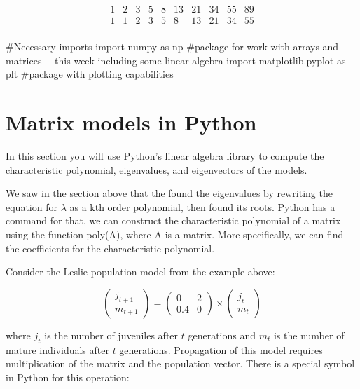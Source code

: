 \documentclass[
  letterpaper,
  DIV=11,
  numbers=noendperiod]{scrreprt}
\newenvironment{Shaded}{\begin{snugshade}}{\end{snugshade}}
\newcommand{\CommentTok}[1]{\textcolor[rgb]{0.37,0.37,0.37}{#1}}
\newcommand{\ImportTok}[1]{\textcolor[rgb]{0.00,0.46,0.62}{#1}}
\newcommand{\NormalTok}[1]{\textcolor[rgb]{0.00,0.23,0.31}{#1}}
\begin{document}
\[
\begin{array}{cccccccccc} 
 1 & 2 & 3 & 5 & 8 & 13 & 21 & 34 & 55 & 89 \\
 1 & 1 & 2 & 3 & 5 & 8 & 13  &  21 & 34 & 55  \\
 \end{array}
\]

\begin{Shaded}
\begin{Highlighting}[]
\CommentTok{\#Necessary imports}
\ImportTok{import}\NormalTok{ numpy }\ImportTok{as}\NormalTok{ np }\CommentTok{\#package for work with arrays and matrices {-}{-} this week including some linear algebra}
\ImportTok{import}\NormalTok{ matplotlib.pyplot }\ImportTok{as}\NormalTok{ plt }\CommentTok{\#package with plotting capabilities}
\end{Highlighting}
\end{Shaded}

\hypertarget{matrix-models-in-python}{%
\section{Matrix models in Python}\label{matrix-models-in-python}}

In this section you will use Python's linear algebra library to compute
the characteristic polynomial, eigenvalues, and eigenvectors of the
models.

We saw in the section above that the found the eigenvalues by rewriting
the equation for \(\lambda\) as a kth order polynomial, then found its
roots. Python has a command for that, we can construct the
characteristic polynomial of a matrix using the function poly(A), where
A is a matrix. More specifically, we can find the coefficients for the
characteristic polynomial.

Consider the Leslie population model from the example above:

\[
\left(\begin{array}{c}j_{t+1}\\ m_{t+1}\end{array}\right) =  \left(\begin{array}{cc}0 & 2 \\0.4 & 0\end{array}\right) \times \left(\begin{array}{c}j_{t}\\ m_{t}\end{array}\right)
\]

where \(j_t\) is the number of juveniles after \(t\) generations and
\(m_t\) is the number of mature individuals after \(t\) generations.
Propagation of this model requires multiplication of the matrix and the
population vector. There is a special symbol in Python for this
operation:
\end{document}
